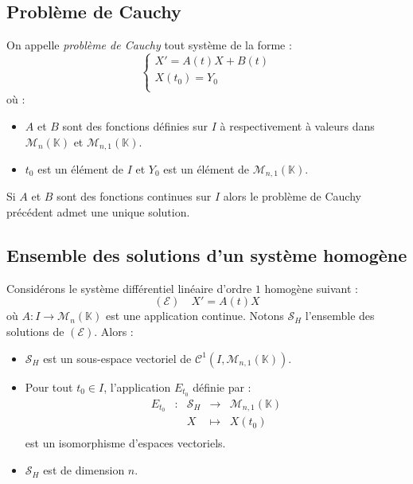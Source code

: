 \documentclass[a4paper,10pt]{report}
\begin{document}
\subsection{Problème de Cauchy}
\begin{defin} On appelle \textit{problème de Cauchy} tout système de la forme :
$$ \left\lbrace \begin{array}{l}
X'=A(t)X+B(t) \\
X(t_0)=Y_0 \\
\end{array}\right.$$
où :
\begin{itemize}
\item $A$ et $B$ sont des fonctions définies sur $I$ à respectivement à valeurs dans $\mathcal{M}_n(\mathbb{K})$ et $\mathcal{M}_{n,1}(\mathbb{K})$.
\item $t_0$ est un élément de $I$ et $Y_0$ est un élément de $\mathcal{M}_{n,1}(\mathbb{K})$.
\end{itemize}
\end{defin}

\begin{thm} Si $A$ et $B$ sont des fonctions continues sur $I$ alors le problème de Cauchy précédent admet une unique solution.
\end{thm}

\subsection{Ensemble des solutions d'un système homogène}

\begin{prop} Considérons le système différentiel linéaire d'ordre $1$ homogène suivant :
$$ (\mathcal{E}) \quad X'=A(t)X$$
où $A : I \rightarrow \mathcal{M}_n(\mathbb{K})$ est une application continue. Notons $\mathcal{S}_H$ l'ensemble des solutions de $(\mathcal{E})$. Alors :

\begin{itemize}
\item $\mathcal{S}_H$ est un sous-espace vectoriel de $\mathcal{C}^1(I, \mathcal{M}_{n,1}(\mathbb{K}))$.
\item Pour tout $t_0 \in I$, l'application $E_{t_0}$ définie par :
$$ \begin{array}{cclll}
E_{t_0} & : & \mathcal{S}_H & \rightarrow & \mathcal{M}_{n,1}(\mathbb{K}) \\
& & X & \mapsto & X(t_0) \\
\end{array}$$
est un isomorphisme d'espaces vectoriels. 
\item $\mathcal{S}_H$ est de dimension $n$.
\end{itemize}
\end{prop}
\end{document}
